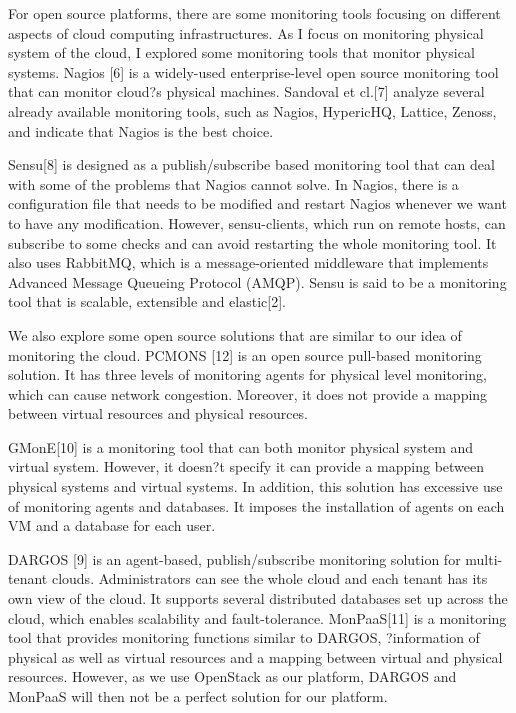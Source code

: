 \documentclass[11pt, oneside]{article}   	%
\begin{document}
	For open source platforms, there are some monitoring tools focusing on different aspects of cloud computing infrastructures. As I focus on monitoring physical system of the cloud, I explored some monitoring tools that monitor physical systems. Nagios [6] is a widely-used enterprise-level open source monitoring tool that can monitor cloud?s physical machines. Sandoval et cl.[7] analyze several already available monitoring tools, such as Nagios, HypericHQ, Lattice, Zenoss, and indicate that Nagios is the best choice. 
	
	
	Sensu[8] is designed as a publish/subscribe based monitoring tool that can deal with some of the problems that Nagios cannot solve. In Nagios, there is a configuration file that needs to be modified and restart Nagios whenever we want to have any modification. However, sensu-clients, which run on remote hosts, can subscribe to some checks and can avoid restarting the whole monitoring tool. It also uses RabbitMQ, which is a message-oriented middleware that implements Advanced Message Queueing Protocol (AMQP). Sensu is said to be a monitoring tool that is scalable, extensible and elastic[2]. 
	
	
	We also explore some open source solutions that are similar to our idea of monitoring the cloud. PCMONS [12] is an open source pull-based monitoring solution. It has three levels of monitoring agents for physical level monitoring, which can cause network congestion. Moreover, it does not provide a mapping between virtual resources and physical resources. 
	
	
	GMonE[10] is a monitoring tool that can both monitor physical system and virtual system. However, it doesn?t specify it can provide a mapping between physical systems and virtual systems. In addition, this solution has excessive use of monitoring agents and databases. It imposes the installation of agents on each VM and a database for each user. 
	
	
	DARGOS [9] is an agent-based, publish/subscribe monitoring solution for multi-tenant clouds. Administrators can see the whole cloud and each tenant has its own view of the cloud. It supports several distributed databases set up across the cloud, which enables scalability and fault-tolerance. MonPaaS[11] is a monitoring tool that provides monitoring functions similar to DARGOS, ?information of physical as well as virtual resources and a mapping between virtual and physical resources. However, as we use OpenStack as our platform, DARGOS and MonPaaS will then not be a perfect solution for our  platform. 
	
\end{document}
